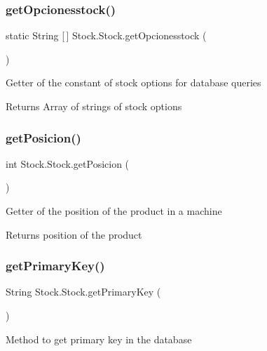\subsubsection{\texorpdfstring{get\+Opcionesstock()}{getOpcionesstock()}}
{\footnotesize\ttfamily static String \mbox{[}$\,$\mbox{]} Stock.\+Stock.\+get\+Opcionesstock (\begin{DoxyParamCaption}{ }\end{DoxyParamCaption})\hspace{0.3cm}{\ttfamily [static]}}

Getter of the constant of stock options for database queries

\begin{DoxyReturn}{Returns}
Array of strings of stock options 
\end{DoxyReturn}
\mbox{\label{class_stock_1_1_stock_aaf8aeb342fb5a0fc05f80a23d03dd5e4}} 
\subsubsection{\texorpdfstring{get\+Posicion()}{getPosicion()}}
{\footnotesize\ttfamily int Stock.\+Stock.\+get\+Posicion (\begin{DoxyParamCaption}{ }\end{DoxyParamCaption})}

Getter of the position of the product in a machine

\begin{DoxyReturn}{Returns}
position of the product 
\end{DoxyReturn}
\mbox{\label{class_stock_1_1_stock_aaba40908c8c5d06d27e39c3f0c57ba07}} 
\subsubsection{\texorpdfstring{get\+Primary\+Key()}{getPrimaryKey()}}
{\footnotesize\ttfamily String Stock.\+Stock.\+get\+Primary\+Key (\begin{DoxyParamCaption}{ }\end{DoxyParamCaption})}

Method to get primary key in the database

